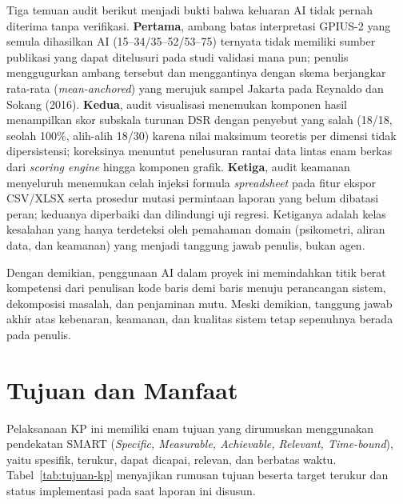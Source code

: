 Tiga temuan audit berikut menjadi bukti bahwa keluaran AI tidak pernah diterima tanpa verifikasi. \textbf{Pertama}, ambang batas interpretasi GPIUS-2 yang semula dihasilkan AI (15--34/35--52/53--75) ternyata tidak memiliki sumber publikasi yang dapat ditelusuri pada studi validasi mana pun; penulis menggugurkan ambang tersebut dan menggantinya dengan skema berjangkar rata-rata (\textit{mean-anchored}) yang merujuk sampel Jakarta pada Reynaldo dan Sokang (2016). \textbf{Kedua}, audit visualisasi menemukan komponen hasil menampilkan skor subskala turunan DSR dengan penyebut yang salah (18/18, seolah 100\%, alih-alih 18/30) karena nilai maksimum teoretis per dimensi tidak dipersistensi; koreksinya menuntut penelusuran rantai data lintas enam berkas dari \textit{scoring engine} hingga komponen grafik. \textbf{Ketiga}, audit keamanan menyeluruh menemukan celah injeksi formula \textit{spreadsheet} pada fitur ekspor CSV/XLSX serta prosedur mutasi permintaan laporan yang belum dibatasi peran; keduanya diperbaiki dan dilindungi uji regresi. Ketiganya adalah kelas kesalahan yang hanya terdeteksi oleh pemahaman domain (psikometri, aliran data, dan keamanan) yang menjadi tanggung jawab penulis, bukan agen.

Dengan demikian, penggunaan AI dalam proyek ini memindahkan titik berat kompetensi dari penulisan kode baris demi baris menuju perancangan sistem, dekomposisi masalah, dan penjaminan mutu. Meski demikian, tanggung jawab akhir atas kebenaran, keamanan, dan kualitas sistem tetap sepenuhnya berada pada penulis.

\section{Tujuan dan Manfaat}
\label{sec:tujuan-manfaat}

Pelaksanaan KP ini memiliki enam tujuan yang dirumuskan menggunakan pendekatan SMART (\textit{Specific, Measurable, Achievable, Relevant, Time-bound}), yaitu spesifik, terukur, dapat dicapai, relevan, dan berbatas waktu. Tabel~\ref{tab:tujuan-kp} menyajikan rumusan tujuan beserta target terukur dan status implementasi pada saat laporan ini disusun.

